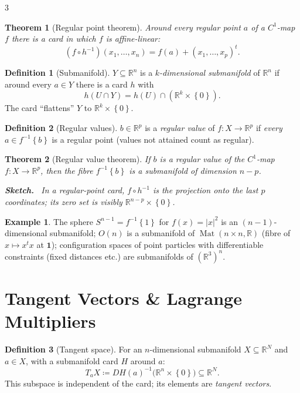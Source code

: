 \documentclass[10pt,a4paper,landscape]{article}
\theoremstyle{definition}
\newtheorem{defn}{Definition}[section]
\newtheorem{exm}{Example}[section]
\theoremstyle{plain}
\newtheorem{thm}{Theorem}[section]
\theoremstyle{remark}
\newcommand{\R}{\mathbb{R}}
\newcommand{\abs}[1]{\lvert #1 \rvert}
\newcommand{\set}[1]{\left\{ #1 \right\}}
\newcommand{\deq}{\coloneqq}
\newcommand{\comp}{\circ}
\DeclareMathOperator{\Mat}{Mat}
\newenvironment{proofsketch}{%
  \par\small\color{exgray}\textbf{Sketch.}\ }%
  {\par}
\begin{document}
\begin{multicols*}{3}
\begin{thm}[Regular point theorem]
Around every regular point $a$ of a $C^1$-map $f$ there is a card in which $f$ is affine-linear:
\[
(f \comp h^{-1})(x_1, \dots, x_n) = f(a) + (x_1, \dots, x_p)^t .
\]
\end{thm}

\begin{defn}[Submanifold]
$Y \subseteq \R^n$ is a \emph{$k$-dimensional submanifold} of $\R^n$ if around every $a \in Y$ there is a card $h$ with
\[
h(U \cap Y) = h(U) \cap (\R^k \times \set{0}) .
\]
The card ``flattens'' $Y$ to $\R^k \times \set{0}$.
\end{defn}

\begin{defn}[Regular values]
$b \in \R^p$ is a \emph{regular value} of $f: X \to \R^p$ if \emph{every} $a \in f^{-1}\set{b}$ is a regular point (values not attained count as regular).
\end{defn}

\begin{thm}[Regular value theorem]
If $b$ is a regular value of the $C^1$-map $f: X \to \R^p$, then the fibre $f^{-1}\set{b}$ is a submanifold of dimension $n - p$.
\begin{proofsketch}
In a regular-point card, $f \comp h^{-1}$ is the projection onto the last $p$ coordinates; its zero set is visibly $\R^{n-p} \times \set{0}$.
\end{proofsketch}
\end{thm}

\begin{exm}
The sphere $S^{n-1} = f^{-1}\set{1}$ for $f(x) = \abs{x}^2$ is an $(n-1)$-dimensional submanifold; $O(n)$ is a submanifold of $\Mat(n \times n, \R)$ (fibre of $x \mapsto x^t x$ at $\mathbf{1}$); configuration spaces of point particles with differentiable constraints (fixed distances etc.) are submanifolds of $(\R^3)^n$.
\end{exm}

\section{Tangent Vectors \& Lagrange Multipliers}

\begin{defn}[Tangent space]
For an $n$-dimensional submanifold $X \subseteq \R^N$ and $a \in X$, with a submanifold card $H$ around $a$:
\[
T_a X \deq DH(a)^{-1}\bigl(\R^n \times \set{0}\bigr) \subseteq \R^N .
\]
This subspace is independent of the card; its elements are \emph{tangent vectors}.
\end{defn}


\end{multicols*}
\end{document}
